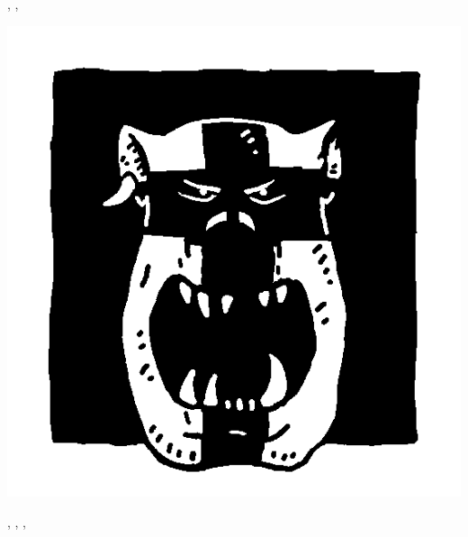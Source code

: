 \begin{multicols}{3}
\begin{center}
\immunetopsychology{}, \weaponmaster{}, \borntofight{}
\end{center}

\columnbreak

\begin{center}
\includegraphics[width=\logosize]{pics/feralorc.png}
\vspace*{-1cm}\subsubtitle{\feralorc}

\frenzy{}, \unruly{}, \borntofight{}, 
\end{center}

\end{multicols}

